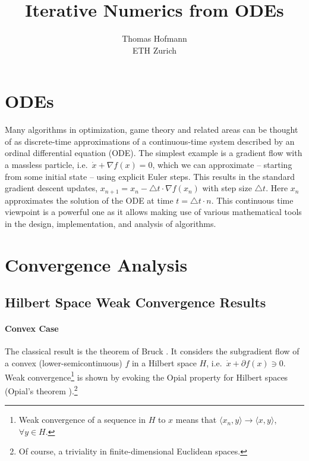 \documentclass{article}
\title{Iterative Numerics from ODEs}
\author{Thomas Hofmann\\ ETH Zurich}
\begin{document}
\maketitle

\section{ODEs} 

Many algorithms in optimization, game theory and related areas can be thought of as discrete-time approximations of a continuous-time system described by an ordinal differential equation (ODE). The simplest example is a gradient flow with a massless particle, i.e.~$\dot x + \nabla f(x)=0$, which we can approximate -- starting from some initial state  --  using explicit Euler steps. This results in the standard gradient descent updates, $x_{n+1} = x_n - \triangle t \cdot \nabla f(x_n)$ with step size $\triangle t$. Here $x_n$ approximates the solution of the ODE at time $t=\triangle t\cdot n$. This continuous time viewpoint is a powerful one as it allows making use of various mathematical tools in the design, implementation, and analysis of algorithms. 



\section{Convergence Analysis}

\subsection{Hilbert Space Weak Convergence Results}
 
\paragraph{Convex Case} The classical result is the theorem of Bruck \cite{bruck1975asymptotic}. It considers the subgradient flow of a convex (lower-semicontinuous) $f$ in a Hilbert space $H$, i.e.~$\dot x + \partial f(x) \ni 0$.  
Weak convergence\footnote{Weak convergence of a sequence in $H$ to $x$ means that $\langle x_n, y \rangle \to \langle x, y\rangle$, $\forall y \in H$.} is shown by evoking the Opial property for Hilbert spaces (Opial's theorem \cite{opial1967theorem}).\footnote{Of course, a triviality in finite-dimensional Euclidean spaces.} 
\end{document}
